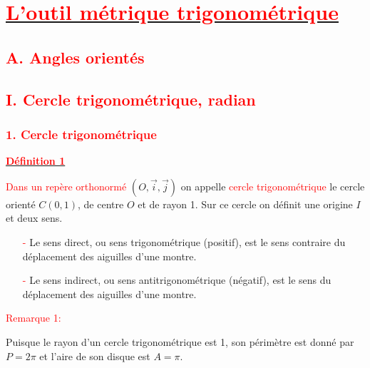 \documentclass[a4paper,12pt]{article}
\begin{document}
\section*{\underline{\textbf{\textcolor{red}{L'outil métrique trigonométrique}}}}

\subsection*{\textcolor{red}{A. Angles orientés}}

\subsection*{\textcolor{red}{I. Cercle trigonométrique, radian}}

\subsubsection*{\textcolor{red}{1. Cercle trigonométrique}}

\underline{\textbf{\textcolor{red}{Définition 1}}}

\textcolor{red}{Dans un repère orthonormé} \( (O, \vec{i}, \vec{j}) \) on appelle \textcolor{red}{cercle trigonométrique} le cercle orienté \( C(0,1) \), de centre \( O \) et de rayon 1. Sur ce cercle on définit une origine \( I \) et deux sens.


    \begin{itemize}
        \item[\textcolor{red}{-}] Le sens direct, ou sens trigonométrique (positif), est le sens contraire du déplacement des aiguilles d'une montre.
        \item[\textcolor{red}{-}] Le sens indirect, ou sens antitrigonométrique (négatif), est le sens du déplacement des aiguilles d'une montre.
    \end{itemize}

\textcolor{red}{Remarque 1:} 

Puisque le rayon d'un cercle trigonométrique est 1, son périmètre est donné par \( P = 2\pi \) et l'aire de son disque est \( A = \pi \).
\end{document}
